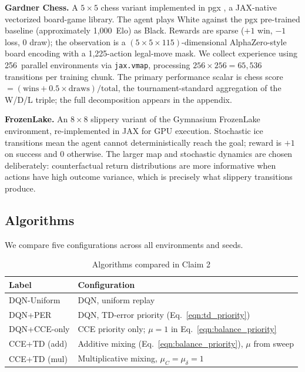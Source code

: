 \documentclass[conference]{IEEEtran}
\begin{document}
\textbf{Gardner Chess.} A $5\times5$ chess variant implemented in pgx \cite{koyamada2023pgx}, a JAX-native vectorized board-game library. The agent plays White against the pgx pre-trained baseline (approximately 1,000~Elo) as Black. Rewards are sparse ($+1$ win, $-1$ loss, $0$ draw); the observation is a $(5\times5\times115)$-dimensional AlphaZero-style board encoding with a 1,225-action legal-move mask. We collect experience using 256~parallel environments via \texttt{jax.vmap}, processing $256\times256 = 65{,}536$ transitions per training chunk. The primary performance scalar is chess score $= (\text{wins} + 0.5\times\text{draws})/\text{total}$, the tournament-standard aggregation of the W/D/L triple; the full decomposition appears in the appendix.

\textbf{FrozenLake.} An $8\times8$ slippery variant of the Gymnasium FrozenLake environment, re-implemented in JAX for GPU execution. Stochastic ice transitions mean the agent cannot deterministically reach the goal; reward is $+1$ on success and $0$ otherwise. The larger map and stochastic dynamics are chosen deliberately: counterfactual return distributions are more informative when actions have high outcome variance, which is precisely what slippery transitions produce.

\subsection{Algorithms}

\noindent We compare five configurations across all environments and seeds.

\begin{table}[htbp]
\caption{Algorithms compared in Claim 2}
\begin{center}
\begin{tabular}{|l|l|}
\hline
\textbf{Label} & \textbf{Configuration} \\
\hline
DQN-Uniform    & DQN, uniform replay \\
DQN+PER        & DQN, TD-error priority (Eq.~\ref{eqn:td_priority}) \\
DQN+CCE-only   & CCE priority only; $\mu=1$ in Eq.~\ref{eqn:balance_priority} \\
CCE+TD (add)   & Additive mixing (Eq.~\ref{eqn:balance_priority}), $\mu$ from sweep \\
CCE+TD (mul)   & Multiplicative mixing, $\mu_C=\mu_\delta=1$ \\
\hline
\end{tabular}
\end{center}
\end{table}
\end{document}
